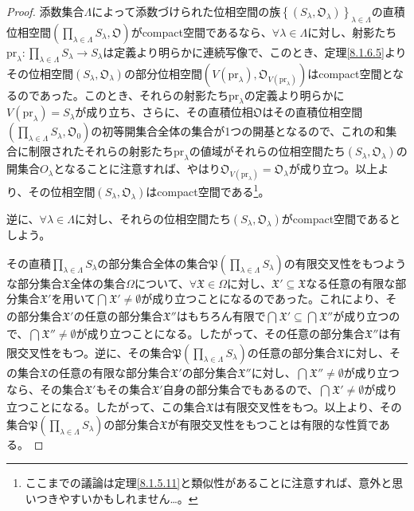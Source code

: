 \documentclass[dvipdfmx]{jsarticle}
\begin{document}
\begin{proof}
添数集合$\varLambda$によって添数づけられた位相空間の族$\left\{ \left( S_{\lambda},\mathfrak{O}_{\lambda} \right) \right\}_{\lambda \in \varLambda}$の直積位相空間$\left( \prod_{\lambda \in \varLambda} S_{\lambda},\mathfrak{O} \right)$がcompact空間であるなら、$\forall\lambda \in \varLambda$に対し、射影たち${\mathrm{pr}}_{\lambda}:\prod_{\lambda \in \varLambda} S_{\lambda} \rightarrow S_{\lambda}$は定義より明らかに連続写像で、このとき、定理\ref{8.1.6.5}よりその位相空間$\left( S_{\lambda},\mathfrak{O}_{\lambda} \right)$の部分位相空間$\left( V\left( {\mathrm{pr}}_{\lambda} \right),\mathfrak{O}_{V\left( {\mathrm{pr}}_{\lambda} \right)} \right)$はcompact空間となるのであった。このとき、それらの射影たち${\mathrm{pr}}_{\lambda}$の定義より明らかに$V\left( {\mathrm{pr}}_{\lambda} \right) = S_{\lambda}$が成り立ち、さらに、その直積位相$\mathfrak{O}$はその直積位相空間$\left( \prod_{\lambda \in \varLambda} S_{\lambda},\mathfrak{O}_{0} \right)$の初等開集合全体の集合が1つの開基となるので、これの和集合に制限されたそれらの射影たち${\mathrm{pr}}_{\lambda}$の値域がそれらの位相空間たち$\left( S_{\lambda},\mathfrak{O}_{\lambda} \right)$の開集合$O_{\lambda}$となることに注意すれば、やはり$\mathfrak{O}_{V\left( {\mathrm{pr}}_{\lambda} \right)} = \mathfrak{O}_{\lambda}$が成り立つ。以上より、その位相空間$\left( S_{\lambda},\mathfrak{O}_{\lambda} \right)$はcompact空間である\footnote{ここまでの議論は定理\ref{8.1.5.11}と類似性があることに注意すれば、意外と思いつきやすいかもしれません…。}。\par
逆に、$\forall\lambda \in \varLambda$に対し、それらの位相空間たち$\left( S_{\lambda},\mathfrak{O}_{\lambda} \right)$がcompact空間であるとしよう。\par
その直積$\prod_{\lambda \in \varLambda} S_{\lambda}$の部分集合全体の集合$\mathfrak{P}\left( \prod_{\lambda \in \varLambda} S_{\lambda} \right)$の有限交叉性をもつような部分集合$\mathfrak{X}$全体の集合$\varOmega$について、$\mathfrak{\forall X \in}\varOmega$に対し、$\mathfrak{X}'\subseteq \mathfrak{X}$なる任意の有限な部分集合$\mathfrak{X}'$を用いて$\bigcap_{} \mathfrak{X}' \neq \emptyset$が成り立つことになるのであった。これにより、その部分集合$\mathfrak{X}'$の任意の部分集合$\mathfrak{X}''$はもちろん有限で$\bigcap_{} \mathfrak{X}' \subseteq \bigcap_{} \mathfrak{X}''$が成り立つので、$\bigcap_{} \mathfrak{X}'' \neq \emptyset$が成り立つことになる。したがって、その任意の部分集合$\mathfrak{X}''$は有限交叉性をもつ。逆に、その集合$\mathfrak{P}\left( \prod_{\lambda \in \varLambda} S_{\lambda} \right)$の任意の部分集合$\mathfrak{X}$に対し、その集合$\mathfrak{X}$の任意の有限な部分集合$\mathfrak{X}'$の部分集合$\mathfrak{X}''$に対し、$\bigcap_{} \mathfrak{X}'' \neq \emptyset$が成り立つなら、その集合$\mathfrak{X}'$もその集合$\mathfrak{X}'$自身の部分集合でもあるので、$\bigcap_{} \mathfrak{X}' \neq \emptyset$が成り立つことになる。したがって、この集合$\mathfrak{X}$は有限交叉性をもつ。以上より、その集合$\mathfrak{P}\left( \prod_{\lambda \in \varLambda} S_{\lambda} \right)$の部分集合$\mathfrak{X}$が有限交叉性をもつことは有限的な性質である。\par

\end{proof}
\end{document}
